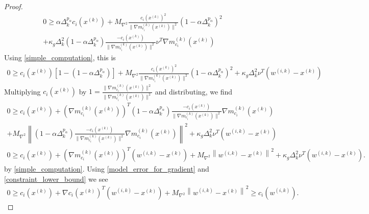 \documentclass{article}
\theoremstyle{case}
\numberwithin{theorem}{subsection}
\newcommand{\dk}{\Delta_k}
\newcommand{\gmcik}{{\nabla m_{c_i}^{(k)}\left(\xk\right)}}
\newcommand{\maxhessian}{{M_{\nabla^2}}}
\newcommand{\wik}{{w^{(i, k)}}}
\newcommand{\xk}{{x^{(k)}}}
\begin{document}
\begin{proof}
\begin{align*}
0\ge \alpha \dk^{p_{\alpha}} c_i(\xk) + \maxhessian \frac {c_i(\xk)^2}{\|\gmcik\|^2}\left(1 - \alpha \dk^{p_{\alpha}}\right)^2  \\
+ \kappa_g \dk^2 \left(1 - \alpha \dk^{p_{\alpha}}\right)\frac{-c_i(\xk)}{\|\gmcik\|^2}\nu^T\gmcik
\end{align*}
Using \cref{simple_computation}, this is
\begin{align*}
0 \ge c_i(\xk)\left[1 - \left(1 - \alpha \dk^{p_{\alpha}}\right)\right] + \maxhessian \frac {c_i(\xk)^2}{\|\gmcik\|^2}\left(1 - \alpha \dk^{p_{\alpha}}\right)^2 + \kappa_g \dk^2\nu^T \left(\wik - \xk\right)
\end{align*}
Multiplying $c_i(\xk)$ by $1 = \frac{\|\gmcik\|^2}{\|\gmcik\|^2}$ and distributing, we find
\begin{align*}
0 \ge c_i(\xk) + \left(\gmcik\right)^T\left(1 - \alpha \dk^{p_{\alpha}}\right)\frac{-c_i(\xk)}{\|\gmcik\|^2}\gmcik  \\
+ \maxhessian \left\|\left(1 - \alpha \dk^{p_{\alpha}}\right)\frac{-c_i(\xk)}{\|\gmcik\|^2}\gmcik\right\|^2
+ \kappa_g \dk^2\nu^T \left(\wik - \xk\right) \\
0 \ge c_i(\xk) + \left(\gmcik\right)^T\left(\wik - \xk\right)+ \maxhessian \left\|\wik - \xk\right\|^2  + \kappa_g \dk^2\nu^T \left(\wik - \xk\right).
\end{align*}
by \cref{simple_computation}.
Using \cref{model_error_for_gradient} and \cref{constraint_lower_bound} we see
\begin{align}
0 \ge c_i(\xk) + \nabla c_i(\xk)^T\left(\wik - \xk \right) + \maxhessian \left\|\wik - \xk\right\|^2 \ge c_i(\wik). \label{c_is_negative}
\end{align}


\end{proof}
\end{document}
